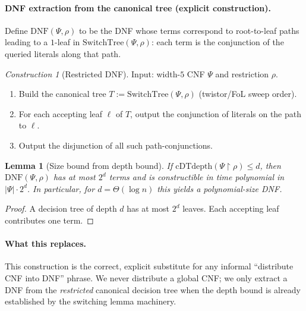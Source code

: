 \documentclass[12pt]{article}
\newtheorem{lemma}[theorem]{Lemma}
\theoremstyle{definition}
\theoremstyle{definition}
\theoremstyle{remark}
\newtheorem{construction}[theorem]{Construction}
\theoremstyle{remark}
\begin{document}
\paragraph{DNF extraction from the canonical tree (explicit construction).}
Define $\mathrm{DNF}(\Psi,\rho)$ to be the DNF whose terms correspond to root-to-leaf paths
leading to a $1$-leaf in $\mathrm{SwitchTree}(\Psi,\rho)$:
each term is the conjunction of the queried literals along that path.

\begin{construction}[Restricted DNF]
\label{constr:restricted-dnf}
Input: width-$5$ CNF $\Psi$ and restriction $\rho$.
\begin{enumerate}
\item Build the canonical tree $T := \mathrm{SwitchTree}(\Psi,\rho)$ (twistor/FoL sweep order).
\item For each accepting leaf $\ell$ of $T$, output the conjunction of literals on the path to $\ell$.
\item Output the disjunction of all such path-conjunctions.
\end{enumerate}
\end{construction}

\begin{lemma}[Size bound from depth bound]
\label{lem:restricted-dnf-size}
If $\mathrm{cDTdepth}(\Psi\!\upharpoonright\!\rho)\le d$, then $\mathrm{DNF}(\Psi,\rho)$ has at most
$2^{d}$ terms and is constructible in time polynomial in $|\Psi|\cdot 2^{d}$.
In particular, for $d=\Theta(\log n)$ this yields a polynomial-size DNF.
\end{lemma}

\begin{proof}
A decision tree of depth $d$ has at most $2^d$ leaves. Each accepting leaf contributes one term.
\end{proof}

\paragraph{What this replaces.}
This construction is the correct, explicit substitute for any informal ``distribute CNF into DNF''
phrase. We never distribute a global CNF; we only extract a DNF from the \emph{restricted} canonical
decision tree when the depth bound is already established by the switching lemma machinery.
\end{document}
